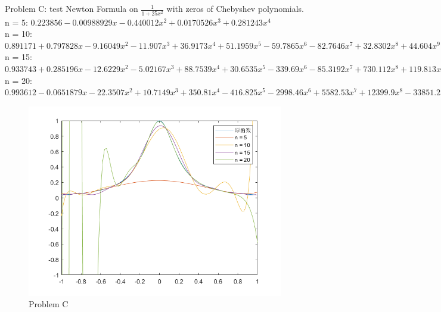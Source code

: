 \documentclass[12pt,letterpaper]{article}
\begin{document}
  \subsection*{} 
    Problem C: test Newton Formula on $\frac{1}{1+25x^2}$ with zeros of Chebyshev polynomials.\\
    n = 5: $0.223856-0.00988929x-0.440012x^{2}+0.0170526x^{3}+0.281243x^{4}$\\
    n = 10: $0.891171+0.797828x-9.16049x^{2}-11.907x^{3}+36.9173x^{4}+51.1959x^{5}-59.7865x^{6}-82.7646x^{7}+32.8302x^{8}+44.604x^{9}$\\
    n = 15: $0.933743+0.285196x-12.6229x^{2}-5.02167x^{3}+88.7539x^{4}+30.6535x^{5}-339.69x^{6}-85.3192x^{7}+730.112x^{8}+119.813x^{9}-877.832x^{10}-83.0762x^{11}+550.437x^{12}+22.6691x^{13}-140.06x^{14}$\\
    n = 20: $0.993612-0.0651879x-22.3507x^{2}+10.7149x^{3}+350.81x^{4}-416.825x^{5}-2998.46x^{6}+5582.53x^{7}+12399.9x^{8}-33851.2x^{9}-18066.4x^{10}+101668x^{11}-24173.6x^{12}-150682x^{13}+107100x^{14}+94115.2x^{15}-117359x^{16}-2625.43x^{17}+42793.2x^{18}-13826.6x^{19}$\\
      \begin{figure}[h]
        \centering
        \includegraphics[width=0.5\linewidth]{pic/C.png}
        \caption{Problem C}
      \end{figure}
\end{document}
